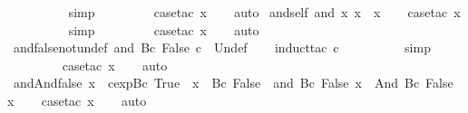 \begin{isabellebody}
\ \ \ \ \ \ \ \ \isamarkupfalse%
\ simp\isanewline
\ \ \ \ \ \ \ \isamarkupfalse%
\ {\isacharparenleft}case{\isacharunderscore}tac\ x{}{\isacharparenright}\isanewline
\ \ \isamarkupfalse%
\ auto%
\endisatagproof
{\isafoldproof}%
%
\isadelimproof
\isanewline
%
\endisadelimproof
\isanewline
{}\isamarkupfalse%
\ and{\isacharunderscore}self{\isacharcolon}\ {\isachardoublequoteopen}and\ x\ x\ {\isacharequal}\ x{\isachardoublequoteclose}\isanewline
%
\isadelimproof
\ \ %
\endisadelimproof
%
\isatagproof
{}\isamarkupfalse%
\ {\isacharparenleft}case{\isacharunderscore}tac\ x{\isacharparenright}\isanewline
\ \ \ \ \ \ \ \ \isamarkupfalse%
\ simp\isanewline
\ \ \ \ \ \ \ \isamarkupfalse%
\ {\isacharparenleft}case{\isacharunderscore}tac\ x{}{\isacharparenright}\isanewline
\ \ \isamarkupfalse%
\ auto%
\endisatagproof
{\isafoldproof}%
%
\isadelimproof
\isanewline
%
\endisadelimproof
\isanewline
{}\isamarkupfalse%
\ and{\isacharunderscore}false{\isacharunderscore}not{\isacharunderscore}undef{\isacharcolon}\ {\isachardoublequoteopen}and\ {\isacharparenleft}Bc\ False{\isacharparenright}\ c\ {\isasymnoteq}\ Undef{\isachardoublequoteclose}\isanewline
%
\isadelimproof
\ \ %
\endisadelimproof
%
\isatagproof
{}\isamarkupfalse%
\ {\isacharparenleft}induct{\isacharunderscore}tac\ c{\isacharparenright}\isanewline
\ \ \ \ \ \ \ \ \isamarkupfalse%
\ simp\isanewline
\ \ \ \ \ \ \ \isamarkupfalse%
\ {\isacharparenleft}case{\isacharunderscore}tac\ x{\isacharparenright}\isanewline
\ \ \isamarkupfalse%
\ auto%
\endisatagproof
{\isafoldproof}%
%
\isadelimproof
\isanewline
%
\endisadelimproof
\isanewline
{}\isamarkupfalse%
\ and{\isacharunderscore}And{\isacharunderscore}false{\isacharcolon}\ {\isachardoublequoteopen}x\ {\isasymnoteq}\ cexp{\isachardot}Bc\ True\ {\isasymand}\ x\ {\isasymnoteq}\ Bc\ False\ {\isasymLongrightarrow}\ and\ {\isacharparenleft}Bc\ False{\isacharparenright}\ x\ {\isacharequal}\ And\ {\isacharparenleft}Bc\ False{\isacharparenright}\ x{\isachardoublequoteclose}\isanewline
%
\isadelimproof
\ \ %
\endisadelimproof
%
\isatagproof
{}\isamarkupfalse%
\ {\isacharparenleft}case{\isacharunderscore}tac\ x{\isacharparenright}\isanewline
\ \ \isamarkupfalse%
\ auto%
\endisatagproof
{\isafoldproof}%
%
\isadelimproof
\isanewline
%
\endisadelimproof
\isanewline
{}\isamarkupfalse%

\end{isabellebody}
